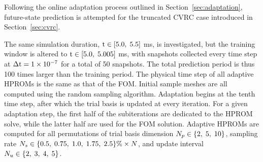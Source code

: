 Following the online adaptation process outlined in Section~\ref{sec:adaptation}, future-state prediction is attempted for the truncated CVRC case introduced in Section~\ref{sec:cvrc}. 

The same simulation duration, $\text{t} \in [5.0, \; 5.5]$ ms, is investigated, but the training window is altered to $\text{t} \in [5.0, \; 5.005]$ ms, with snapshots collected every time step at $\Delta \text{t} = 1 \times 10^{-7}$ for a total of 50 snapshots. The total prediction period is thus 100 times larger than the training period. The physical time step of all adaptive HPROMs is the same as that of the FOM. Initial sample meshes are all computed using the random sampling algorithm. Adaptation begins at the tenth time step, after which the trial basis is updated at every iteration. For a given adaptation step, the first half of the subiterations are dedicated to the HPROM solve, while the latter half are used for the FOM solution. Adaptive HPROMs are computed for all permutations of trial basis dimension $N_p \in \{2, \; 5, \; 10\}$, sampling rate $N_s \in \{0.5, \; 0.75, \; 1.0, \; 1.75, \; 2.5\}\% \times N$, and update interval $N_u \in \{2, \; 3, \; 4, \; 5\}$. 

